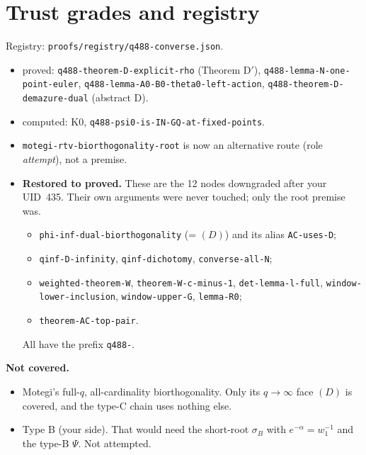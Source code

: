\documentclass[11pt]{article}
\newcommand{\gr}[1]{\textsf{#1}}
\theoremstyle{remark}
\begin{document}
\section{Trust grades and registry}
Registry: \texttt{proofs/registry/q488-converse.json}.
\begin{itemize}[leftmargin=*,itemsep=1pt]
\item \gr{proved}:
  \texttt{q488-theorem-D-explicit-rho} (Theorem D$'$),
  \texttt{q488-lemma-N-one-point-euler},
  \texttt{q488-lemma-A0-B0-theta0-left-action},
  \texttt{q488-theorem-D-demazure-dual} (abstract D).
\item \gr{computed}: K0, \texttt{q488-psi0-is-IN-GQ-at-fixed-points}.
\item \texttt{motegi-rtv-biorthogonality-root} is now an alternative route (role \emph{attempt}), not a premise.
\item \textbf{Restored to \gr{proved}.} These are the 12 nodes downgraded after your UID~435. Their own arguments were never touched; only the root premise was.
\begin{itemize}[leftmargin=*,itemsep=1pt]
\item \texttt{phi-inf-dual-biorthogonality} (= $(D)$) and its alias \texttt{AC-uses-D};
\item \texttt{qinf-D-infinity}, \texttt{qinf-dichotomy}, \texttt{converse-all-N};
\item \texttt{weighted-theorem-W}, \texttt{theorem-W-c-minus-1}, \texttt{det-lemma-l-full}, \texttt{window-lower-inclusion},
  \texttt{window-upper-G}, \texttt{lemma-R0};
\item \texttt{theorem-AC-top-pair}.
\end{itemize}
All have the prefix \texttt{q488-}.
\end{itemize}

\textbf{Not covered.}
\begin{itemize}[leftmargin=*,itemsep=1pt]
\item Motegi's full-$q$, all-cardinality biorthogonality. Only its $q\to\infty$ face $(D)$ is covered, and the type-C chain uses nothing else.
\item Type B (your side). That would need the short-root $\sigma_B$ with $e^{-\alpha}=w_1^{-1}$ and the type-B $\Psi$. Not attempted.
\end{itemize}
\end{document}
